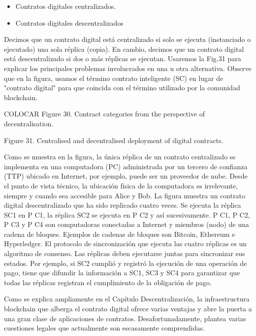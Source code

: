 \documentclass[12pt]{report} %
\begin{document}
\begin{itemize}
\begin{itemize}
    
    \item Contratos digitales centralizados.

    \item Contratos digitales descentralizados

   
\end{itemize}

Decimos que un contrato digital está centralizado si solo se ejecuta (instanciado o ejecutado) una sola réplica (copia). En cambio, decimos que un contrato digital está descentralizado si dos o más réplicas se ejecutan. Usaremos la Fig.31 para explicar los principales problemas involucrados en una u otra alternativa. Observe que en la figura, usamos el término contrato inteligente (SC) en lugar de "contrato digital" para que coincida con el término utilizado por la comunidad blockchain.

COLOCAR Figure 30. Contract categories from the perspective of decentralisation.

Figure 31. Centralised and decentralised deployment of digital contracts.

Como se muestra en la figura, la única réplica de un contrato centralizado se implementa en una computadora (PC) administrada por un tercero de confianza (TTP) ubicado en Internet, por ejemplo, puede ser un proveedor de nube. Desde el punto de vista técnico, la ubicación física de la computadora es irrelevante, siempre y cuando sea accesible para Alice y Bob. La figura muestra un contrato digital descentralizado que ha sido replicado cuatro veces. Se ejecuta la réplica SC1 en P C1, la réplica SC2 se ejecuta en P C2 y así sucesivamente. P C1, P C2, P C3 y P C4 son computadoras conectadas a Internet y miembros (nodo) de una cadena de bloques. Ejemplos de cadenas de bloques
son Bitcoin, Ethereum e Hyperledger. El protocolo de sincronización que ejecuta las cuatro réplicas es un algoritmo de consenso. Las réplicas deben ejecutarse juntas para sincronizar sus estados. Por ejemplo, si SC2 cumplió y registró la ejecución de una operación de pago, tiene que difundir la información a SC1, SC3 y SC4 para garantizar que todas las réplicas registran el cumplimiento de la obligación de pago.

Como se explica ampliamente en el Capítulo Descentralización, la infraestructura blockchain que alberga el contrato digital ofrece varias ventajas y abre la puerta a una gran clase de aplicaciones de contratos. Desafortunadamente, plantea varias cuestiones legales que actualmente son escasamente comprendidas.


\end{itemize}
\end{document}
